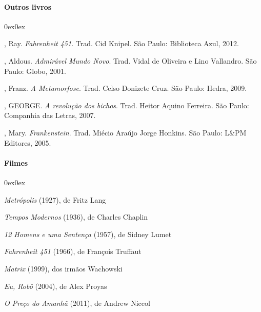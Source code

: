 \documentclass[11pt]{hedrabook}
\begin{document}
\paragraph{Outros livros}

\begin{description}0ex\parsep0ex
\newcommand{\tit}[1]{\item[\textnormal{\textsc{\MakeTextLowercase{#1}}}]}
\newcommand{\titidem}{\item[\line(1,0){25}]}

\tit{BRADBURY}, Ray. \textit{Fahrenheit 451}. Trad. Cid Knipel. São Paulo: Biblioteca
Azul, 2012.

\tit{HUXLEY}, Aldous. \textit{Admirável Mundo Novo}. Trad. Vidal de Oliveira e Lino
Vallandro. São Paulo: Globo, 2001. 

\tit{KAFKA}, Franz. \textit{A Metamorfose}. Trad. Celso Donizete Cruz. São
Paulo: Hedra, 2009.

\tit{ORWELL}, GEORGE. \textit{A revolução dos bichos}. Trad. Heitor Aquino Ferreira.
São Paulo: Companhia das Letras, 2007.

\tit{SHELLEY}, Mary. \textit{Frankenstein}. Trad.  Miécio Araújo Jorge Honkins. São
Paulo: L\&PM Editores, 2005.

\end{description}

\paragraph{Filmes}

\begin{description}0ex\parsep0ex
\newcommand{\tit}[1]{\item[\textnormal{\textsc{\MakeTextLowercase{#1}}}]}
\newcommand{\titidem}{\item[\line(1,0){25}]}

\tit{}\textit{Metrópolis} (1927), de Fritz Lang

\tit{}\textit{Tempos Modernos} (1936), de Charles Chaplin

\tit{}\textit{12 Homens e uma Sentença} (1957), de Sidney Lumet

\tit{}\textit{Fahrenheit 451} (1966), de François Truffaut

\tit{}\textit{Matrix} (1999), dos irmãos Wachowski

\tit{}\textit{Eu, Robô} (2004), de Alex Proyas

\tit{}\textit{O Preço do Amanhã} (2011), de Andrew Niccol

\end{description}
\end{document}
